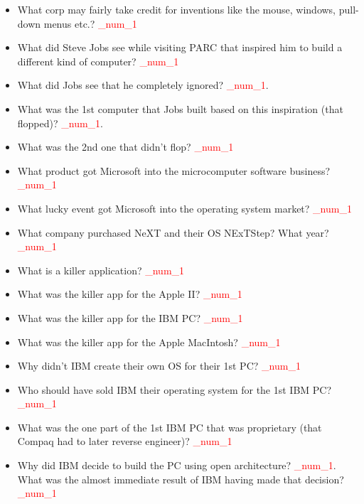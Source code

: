 \documentclass[9pt,landscape]{memoir}
\newcommand{\answer}[1]{\textcolor{red}{_num_1}}
\begin{document}
\begin{multicols}{6}
\begin{itemize}
    \item What corp may fairly take credit for inventions like the mouse, windows, pull-down menus etc.? \answer{Xerox/PARC}
    \item What did Steve Jobs see while visiting PARC that inspired him to build a different kind of computer? \answer{GUI}
    \item What did Jobs see that he completely ignored? \answer{object oriented programming and E-mail}.
    \item What was the 1st computer that Jobs built based on this inspiration (that flopped)? \answer{Lisa}.
    \item What was the 2nd one that didn't flop? \answer{Macintosh}
    \item What product got Microsoft into the microcomputer software business? \answer{BASIC language interpreter}
    \item What lucky event got Microsoft into the operating system market? \answer{Gary Kildall didn't eagerly pursue IBM when they requested a new OS. His wife and attorney would not sign a nondisclosure agreement. Bill Gates of Microsoft saw this as an opportunity and jumped in.}
    \item What company purchased NeXT and their OS NExTStep? What year? \answer{Apple, in 1996}
    \item What is a killer application? \answer{Software that's so useful that people will buy computers just to run it.}
    \item What was the killer app for the Apple II? \answer{Visicalc}
    \item What was the killer app for the IBM PC? \answer{Lotus 1-2-3}
    \item What was the killer app for the Apple MacIntosh? \answer{Wysiwyg - What you see is what you get -> Desktop Publishing}
    \item Why didn't IBM create their own OS for their 1st PC? \answer{wanted to manufacture and market it very fast; within one-year "....Once IBM decided to do a personal computer and to do it in a year - they couldn't really design anything, they just had to slap it together, so that's what they did ..."}
    \item Who should have sold IBM their operating system for the 1st IBM PC? \answer{Gary Kildall of Digital Research} \item What was the one part of the 1st IBM PC that was proprietary (that Compaq had to later reverse engineer)? \answer{ROM-BIOS}
    \item Why did IBM decide to build the PC using open architecture? \answer{To save time, instead of building a computer from scratch, IBM initially decided to buy PC components off the shelf and assemble them -- in IBM terms, this was called an open architecture. IBM made some changes to this initial decision}. What was the almost immediate result of IBM having made that decision? \answer{IBM had to buy the OS and other software from other companies as well.}

\end{itemize}
\end{multicols}
\end{document}
